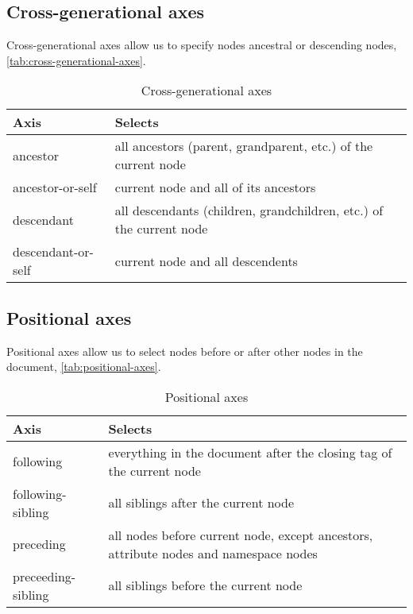 \documentclass[slides]{pgnotes}
\begin{document}
\subsection{Cross-generational axes} 

Cross-generational axes allow us to specify nodes ancestral or descending nodes, \autoref{tab:cross-generational-axes}. 

\begin{table}[htbp]
  \begin{tabularx}{1.0\linewidth}{l X}
    \toprule
    \textbf{Axis} & \textbf{Selects} \\
    \midrule
    ancestor & all ancestors (parent, grandparent, etc.) of the current node \\
    ancestor-or-self & current node and all of its ancestors \\
    descendant & all descendants (children, grandchildren, etc.) of the current node \\
    descendant-or-self & current node and all descendents \\
    \bottomrule
  \end{tabularx}
  \caption{Cross-generational axes}
  \label{tab:cross-generational-axes}
\end{table}




\subsection{Positional axes} 

Positional axes allow us to select nodes before or after other nodes in the document, \autoref{tab:positional-axes}. 

\begin{table}[htbp]
  \begin{tabularx}{1.0\linewidth}{l X}
    \toprule
    \textbf{Axis} & \textbf{Selects} \\
    \midrule
    following & everything in the document after the closing tag of the current node \\
    following-sibling & all siblings after the current node \\
    preceding &  all nodes  before  current node, except ancestors, attribute nodes and namespace nodes \\
    preceeding-sibling & all siblings before the current node \\
    \bottomrule
  \end{tabularx}
  \caption{Positional axes}
  \label{tab:positional-axes}
\end{table}
\end{document}
